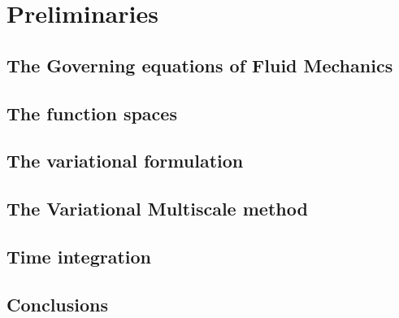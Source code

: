 
\chapter{Preliminaries}
\label{chap-Preliminaries}


\newcommand{\keyword}[1]{\textbf{#1}}
\newcommand{\tabhead}[1]{\textbf{#1}}
\newcommand{\code}[1]{\texttt{#1}}
\newcommand{\file}[1]{\texttt{\bfseries#1}}
\newcommand{\option}[1]{\texttt{\itshape#1}}


\section{The Governing equations of Fluid Mechanics}
\label{sec-C2_gov_eq}


\section{The function spaces}
\label{sec-C2_functional_spaces}


\section{The variational formulation}
\label{sec-C2_variational}


\section{The Variational Multiscale method}
\label{sec-C2_vms}


\section{Time integration}
\label{sec-C2_time_integration}



\section{Conclusions}
\label{sec-C2_conclusions}
